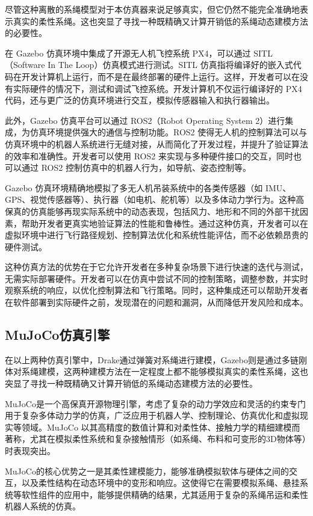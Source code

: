 \documentclass[lang=chs, degree=master, blindreview=true, winfonts=true]{yanputhesis}
\begin{document}
尽管这种离散的系绳模型对于本仿真器来说足够真实，但它仍然不能完全准确地表示真实的柔性系绳。这也突显了寻找一种既精确又计算开销低的系绳动态建模方法的必要性。

在 Gazebo 仿真环境中集成了开源无人机飞控系统 PX4，可以通过 SITL（Software In The Loop）仿真模式进行测试。SITL 仿真指将编译好的嵌入式代码在开发计算机上运行，而不是在最终部署的硬件上运行。这样，开发者可以在没有实际硬件的情况下，测试和调试飞控系统。开发计算机不仅运行编译好的 PX4 代码，还与更广泛的仿真环境进行交互，模拟传感器输入和执行器输出。

此外，Gazebo 仿真平台可以通过 ROS2（Robot Operating System 2）进行集成，为仿真环境提供强大的通信与控制功能。ROS2 使得无人机的控制算法可以与仿真环境中的机器人系统进行无缝对接，从而简化了开发过程，并提升了验证算法的效率和准确性。开发者可以使用 ROS2 来实现与多种硬件接口的交互，同时也可以通过 ROS2 控制仿真中的机器人行为，如导航、姿态控制等。

Gazebo 仿真环境精确地模拟了多无人机吊装系统中的各类传感器（如 IMU、GPS、视觉传感器等）、执行器（如电机、舵机等）以及多体动力学行为。这种高保真的仿真能够再现实际系统中的动态表现，包括风力、地形和不同的外部干扰因素，帮助开发者更真实地验证算法的性能和鲁棒性。通过这种仿真，开发者可以在虚拟环境中进行飞行路径规划、控制算法优化和系统性能评估，而不必依赖昂贵的硬件测试。

这种仿真方法的优势在于它允许开发者在多种复杂场景下进行快速的迭代与测试，无需实际部署硬件。开发者可以在仿真中尝试不同的控制策略，调整参数，并实时观察系统的响应，以优化控制算法和飞行策略。同时，这种集成还可以帮助开发者在软件部署到实际硬件之前，发现潜在的问题和漏洞，从而降低开发风险和成本。

\subsection{MuJoCo仿真引擎}

在以上两种仿真引擎中，Drake通过弹簧对系绳进行建模，Gazebo则是通过多链刚体对系绳建模，这两种建模方法在一定程度上都不能够模拟真实的柔性系绳，这也突显了寻找一种既精确又计算开销低的系绳动态建模方法的必要性。

MuJoCo是一个高保真开源物理引擎，考虑了复杂的动力学效应和灵活的约束专门用于复杂多体动力学的仿真，广泛应用于机器人学、控制理论、仿真优化和虚拟现实等领域。MuJoCo 以其高精度的数值计算和对柔性体、接触力学的精细建模而著称，尤其在模拟柔性系统和复杂接触情形（如系绳、布料和可变形的3D物体等）时表现突出。

MuJoCo的核心优势之一是其柔性建模能力，能够准确模拟软体与硬体之间的交互，以及柔性结构在动态环境中的变形和响应。这使得它在需要模拟系绳、悬挂系统等软性组件的应用中，能够提供精确的结果，尤其适用于复杂的系绳吊运和柔性机器人系统的仿真。
\end{document}
